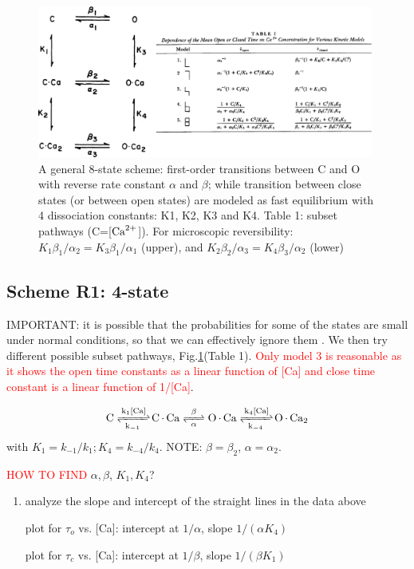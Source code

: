\begin{figure}[hbt]
 \centerline{\includegraphics[height=5cm]{./images/SK(Ca)-model.eps}}
\caption{A general 8-state scheme: first-order transitions between C and O with
reverse rate constant $\alpha$ and $\beta$; while transition between close
states (or between open states) are modeled as fast equilibrium with 4
dissociation constants: K1, K2, K3 and K4.
Table 1: subset pathways (C=[${\text{Ca}^{2+}}$]). For microscopic reversibility:
$K_1\beta_1/\alpha_2 = K_3\beta_1/\alpha_1$ (upper), and $K_2\beta_2/\alpha_3= K_4\beta_3/\alpha_2$ (lower)}
\label{fig:SK(Ca)-model}
\end{figure}

\subsection{Scheme R1: 4-state}

IMPORTANT: it is possible that the probabilities for some of the states are
small under normal conditions, so that we can effectively ignore them .
We then try different possible subset pathways,
Fig.\ref{fig:SK(Ca)-model}(Table 1).
\textcolor{red}{Only model 3 is reasonable as it shows the open time constants
as a linear function of [Ca] and close time constant is a linear function of
1/[Ca]}.

\begin{equation}
\ce{C <=>[k_1\text{[Ca]}][k_{-1}] C.Ca <=>[\beta][\alpha] O.Ca
<=>[k_4\text{[Ca]}][k_{-4}] O.Ca_2}
\end{equation}
with $K_1 = k_{-1}/k_1; K_4 = k_{-4}/k_4$.
NOTE: $\beta=\beta_2$, $\alpha=\alpha_2$.


\textcolor{red}{HOW TO FIND} $\alpha, \beta$, $K_1, K_4$?
\begin{enumerate}
  \item analyze the slope and intercept of the straight lines in the data above

plot for $\tau_o$ vs. [Ca]: intercept at $1/\alpha$, slope $1/(\alpha K_4)$

plot for $\tau_c$ vs. [Ca]: intercept at $1/\beta$, slope $1/(\beta K_1)$

\end{enumerate}

